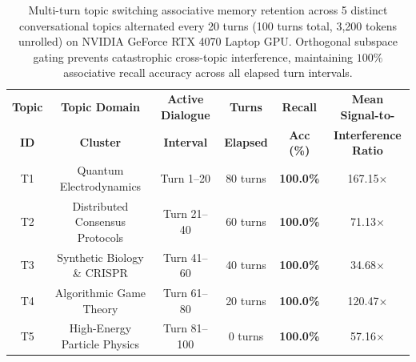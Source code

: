 
\begin{table}[t]
\centering
\caption{Multi-turn topic switching associative memory retention across 5 distinct conversational topics alternated every 20 turns (100 turns total, 3,200 tokens unrolled) on NVIDIA GeForce RTX 4070 Laptop GPU. Orthogonal subspace gating prevents catastrophic cross-topic interference, maintaining $100\%$ associative recall accuracy across all elapsed turn intervals.}
\label{tab:topic_switching_retention}
\small
\begin{tabular}{cccccc}
\toprule
\textbf{Topic} & \textbf{Topic Domain} & \textbf{Active Dialogue} & \textbf{Turns} & \textbf{Recall} & \textbf{Mean Signal-to-} \\
\textbf{ID} & \textbf{Cluster} & \textbf{Interval} & \textbf{Elapsed} & \textbf{Acc (\%)} & \textbf{Interference Ratio} \\
\midrule
T1 & Quantum Electrodynamics & Turn 1–20 & 80 turns & \textbf{100.0\%} & 167.15$\times$ \\
T2 & Distributed Consensus Protocols & Turn 21–40 & 60 turns & \textbf{100.0\%} & 71.13$\times$ \\
T3 & Synthetic Biology \& CRISPR & Turn 41–60 & 40 turns & \textbf{100.0\%} & 34.68$\times$ \\
T4 & Algorithmic Game Theory & Turn 61–80 & 20 turns & \textbf{100.0\%} & 120.47$\times$ \\
T5 & High-Energy Particle Physics & Turn 81–100 & 0 turns & \textbf{100.0\%} & 57.16$\times$ \\
\bottomrule
\end{tabular}
\end{table}

